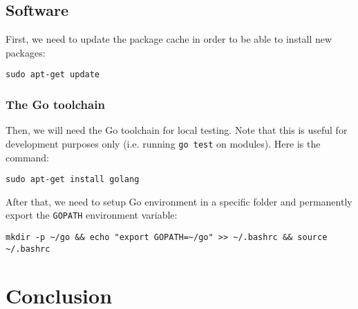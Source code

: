 \documentclass[11pt,a4paper]{article}
\begin{document}
\subsection{Software}

First, we need to update the package cache in order to be able to install new packages:
\begin{verbatim}
sudo apt-get update
\end{verbatim}

\subsubsection{The Go toolchain}

Then, we will need the Go toolchain for local testing. Note that this is useful for development purposes only (i.e. running \texttt{go test} on modules). Here is the command:
\begin{verbatim}
sudo apt-get install golang
\end{verbatim}

After that, we need to setup Go environment in a specific folder and permanently export the \texttt{GOPATH} environment variable:
\begin{verbatim}
mkdir -p ~/go && echo "export GOPATH=~/go" >> ~/.bashrc && source ~/.bashrc
\end{verbatim}

\section*{Conclusion}

\end{document}

